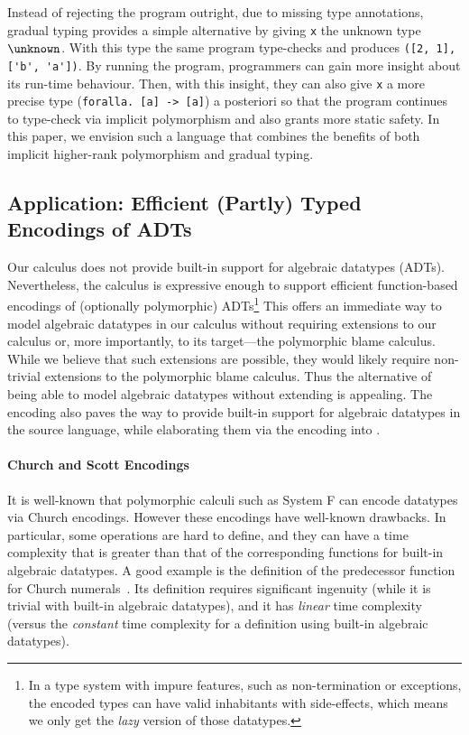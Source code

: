 Instead
of rejecting the program outright, due to missing type annotations, gradual
typing provides a simple alternative by giving \lstinline$x$ the unknown type
$\unknown$. With this type the same program type-checks and produces
\lstinline$([2, 1], ['b', 'a'])$. By running the program, programmers can gain
more insight about its run-time behaviour. Then, with this insight, they can
also give \lstinline$x$ a more precise type (\lstinline$foralla. [a] -> [a]$) a
posteriori so that the program continues to type-check via implicit polymorphism
and also grants more static safety. In this paper, we envision such a language
that combines the benefits of both implicit higher-rank polymorphism and gradual
typing.

\subsection{Application: Efficient (Partly) Typed Encodings of ADTs}

Our calculus does not provide built-in support for algebraic datatypes (ADTs).
Nevertheless, the calculus is expressive enough to support efficient
function-based encodings of (optionally polymorphic) ADTs\footnote{In a type
  system with impure features, such as non-termination or exceptions, the encoded
  types can have valid inhabitants with side-effects, which means we only get
  the \textit{lazy} version of those datatypes.}
This offers an immediate way to model algebraic
datatypes in our calculus without requiring extensions to our calculus or, more
importantly, to its target---the polymorphic blame calculus. While we believe
that such extensions are possible, they would likely require non-trivial
extensions to the polymorphic blame calculus. Thus the alternative of being able
to model algebraic datatypes without extending \pbc is appealing. The encoding
also paves the way to provide built-in support for algebraic datatypes in the
source language, while elaborating them via the encoding into \pbc.

\paragraph{Church and Scott Encodings}
It is well-known
that polymorphic calculi such as System F can encode datatypes via
Church encodings. However these encodings have well-known drawbacks. 
In particular, some operations are hard to define, and they can have a time
complexity that is greater than that of the corresponding functions for built-in
algebraic datatypes. A good example is the definition of
the predecessor function for Church numerals~\citep{church1941calculi}. Its
definition requires significant ingenuity (while it is trivial with 
built-in algebraic datatypes), and it has \emph{linear} time
complexity (versus the \emph{constant} time complexity for a definition 
using built-in algebraic datatypes). 

